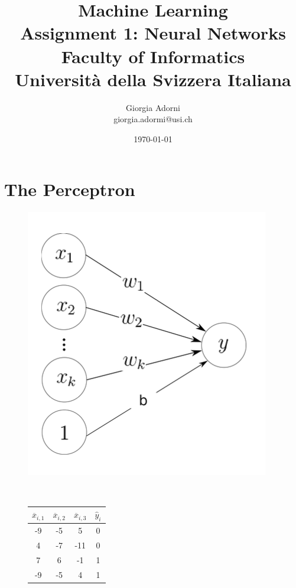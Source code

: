 \documentclass[12pt]{article}
\title{Machine Learning \\ \Large{Assignment 1: Neural Networks} \\[0.3em] \normalsize{Faculty of Informatics} \\ \normalsize{Università della Svizzera Italiana}}
\author {{Giorgia Adorni}	\\ \normalsize{giorgia.adormi@usi.ch}}
\date{\today}
\begin{document}
 


\maketitle 

\section{The Perceptron}
\begin{figure}[h!]
	
	\begin{minipage}[c]{.49\textwidth}
		\centering
		\includegraphics[width=.7\linewidth]{neuron.png}
		\label{fig:test1}
	\end{minipage}%
	~
	\begin{minipage}[c]{.49\textwidth}
		\centering
			\begin{tabular}{|c|c|c|c|}
				\hline
				$\overline{x}_{i,1}$ & $\overline{x}_{i,2}$ & $\overline{x}_{i,3}$ & $\hat{y}_i$ \\\hline
				-9         & -5         & 5          & 0                           \\\hline
				4          & -7         & -11        & 0                           \\\hline
				7          & 6          & -1         & 1                           \\\hline
				-9         & -5         & 4          & 1                           \\\hline

\end{tabular}
\end{minipage}
\end{figure}
\end{document}
